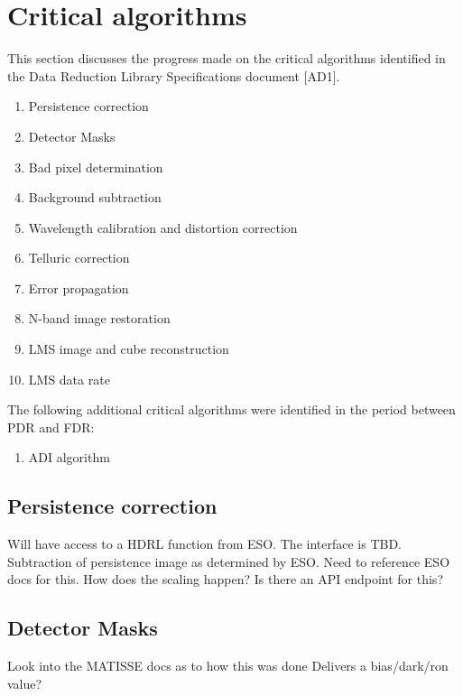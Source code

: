 \clearpage
\section{Critical algorithms}\label{sec:critical_algorithms}

This section discusses the progress made on the critical algorithms identified in the Data Reduction Library Specifications document [AD1].

\begin{enumerate}
    \item Persistence correction
    \item Detector Masks
    \item Bad pixel determination
    \item Background subtraction
    \item Wavelength calibration and distortion correction
    \item Telluric correction
    \item Error propagation
    \item N-band image restoration
    \item LMS image and cube reconstruction
    \item LMS data rate
\end{enumerate}

The following additional critical algorithms were identified in the period between PDR and FDR:

\begin{enumerate}
    \item ADI algorithm
\end{enumerate}

\subsection{Persistence correction}\label{ssec:criticalpersistencecorrection}

Will have access to a HDRL function from ESO.
The interface is TBD.
Subtraction of persistence image as determined by ESO.
Need to reference ESO docs for this.
How does the scaling happen?
Is there an API endpoint for this?


\subsection{Detector Masks}\label{ssec:criticaldetetctormasks}

Look into the MATISSE docs as to how this was done
Delivers a bias/dark/ron value?

